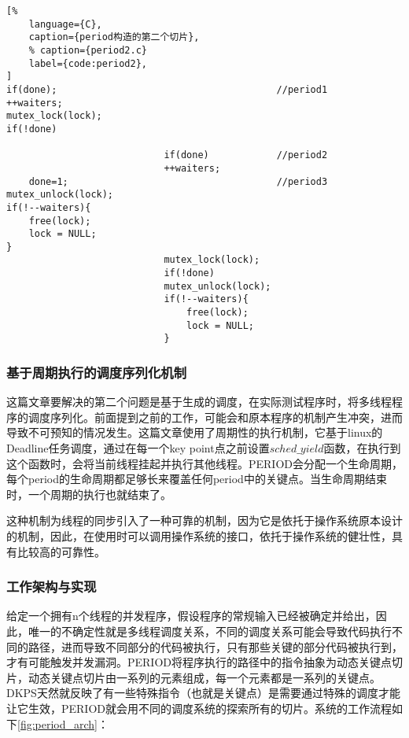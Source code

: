 \begin{spacing}{1.0}
\begin{lstlisting}[%
    language={C},
    caption={period构造的第二个切片},
    % caption={period2.c}
    label={code:period2},
]
if(done);                                       //period1
++waiters;
mutex_lock(lock); 
if(!done) 

                            if(done)            //period2
                            ++waiters;
    done=1;                                     //period3
mutex_unlock(lock); 
if(!--waiters){ 
    free(lock); 
    lock = NULL; 
} 
                            mutex_lock(lock); 
                            if(!done)
                            mutex_unlock(lock);
                            if(!--waiters){ 
                                free(lock); 
                                lock = NULL; 
                            }
\end{lstlisting}
\end{spacing}

\subsubsection{基于周期执行的调度序列化机制}

这篇文章要解决的第二个问题是基于生成的调度，在实际测试程序时，将多线程程序的调度序列化。前面提到之前的工作，可能会和原本程序的机制产生冲突，进而导致不可预知的情况发生。这篇文章使用了周期性的执行机制，它基于linux的Deadline任务调度，通过在每一个key point点之前设置$sched\_yield$函数，在执行到这个函数时，会将当前线程挂起并执行其他线程。PERIOD会分配一个生命周期，每个period的生命周期都足够长来覆盖任何period中的关键点。当生命周期结束时，一个周期的执行也就结束了。

这种机制为线程的同步引入了一种可靠的机制，因为它是依托于操作系统原本设计的机制，因此，在使用时可以调用操作系统的接口，依托于操作系统的健壮性，具有比较高的可靠性。

\subsubsection{工作架构与实现}

给定一个拥有n个线程的并发程序，假设程序的常规输入已经被确定并给出，因此，唯一的不确定性就是多线程调度关系，不同的调度关系可能会导致代码执行不同的路径，进而导致不同部分的代码被执行，只有那些关键的部分代码被执行到，才有可能触发并发漏洞。PERIOD将程序执行的路径中的指令抽象为动态关键点切片，动态关键点切片由一系列的元素组成，每一个元素都是一系列的关键点。DKPS天然就反映了有一些特殊指令（也就是关键点）是需要通过特殊的调度才能让它生效，PERIOD就会用不同的调度系统的探索所有的切片。系统的工作流程如下\autoref{fig:period_arch}：

